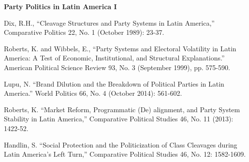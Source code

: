\documentclass[letterpaper]{article}
\renewenvironment{itemize}{
  \begin{list}{}{
    \setlength{\leftmargin}{1.5em}
  }
}{
  \end{list}
}
\begin{document}
\begin{enumerate}
\item {\bf Party Politics in Latin America I}
	\begin{itemize}
		\item[$\bullet$] Dix, R.H., ``Cleavage Structures and Party Systems in Latin America,'' Comparative Politics 22, No. 1 (October 1989): 23-37.
		\item[$\bullet$] Roberts, K. and Wibbels, E., ``Party Systems and Electoral Volatility in Latin America: A Test of Economic, Institutional, and Structural Explanations.'' American Political Science Review 93, No. 3 (September 1999), pp. 575-590.
		\item[$\bullet$] Lupu, N. ``Brand Dilution and the Breakdown of Political Parties in Latin America.'' World Politics 66, No. 4 (October 2014): 561-602.
		\item[$\bullet$] Roberts, K. ``Market Reform, Programmatic (De) alignment, and Party System Stability in Latin America,'' Comparative Political Studies 46, No. 11 (2013): 1422-52.
		\item[$\bullet$] Handlin, S. ``Social Protection and the Politicization of Class Cleavages during Latin America's Left Turn,'' Comparative Political Studies 46, No. 12: 1582-1609.
	\end{itemize}




\end{enumerate}
\end{document}
